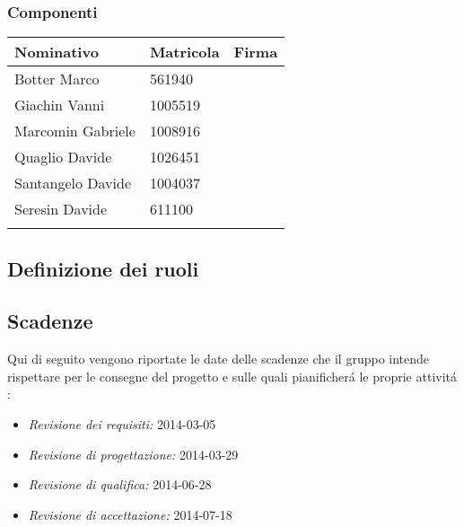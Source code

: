 \subsubsection{Componenti}
\begin{center}
\begin{tabular}{l l l}
\hline
Nominativo & Matricola & Firma\\
\hline
Botter Marco & 561940 & \\ %
\hline
Giachin Vanni & 1005519 & \\ %
\hline
Marcomin Gabriele & 1008916 & \\ %
\hline
Quaglio Davide & 1026451 &  \\ %
\hline
Santangelo Davide & 1004037 & \\ %
\hline
Seresin Davide & 611100 & \\ %
\hline
\\
\end{tabular}
\end{center}
\subsection{Definizione dei ruoli}

\subsection{Scadenze}
\label{subsec:Scadenze}
Qui di seguito vengono riportate le date delle scadenze che il gruppo \gruppo intende rispettare per le consegne del progetto e sulle quali pianificher\'a le proprie attivit\'a :
\begin{itemize}
	\item \textit{Revisione dei requisiti: }2014-03-05
	\item \textit{Revisione di progettazione: }2014-03-29
	\item \textit{Revisione di qualifica: }2014-06-28
	\item \textit{Revisione di accettazione: }2014-07-18
\end{itemize}
